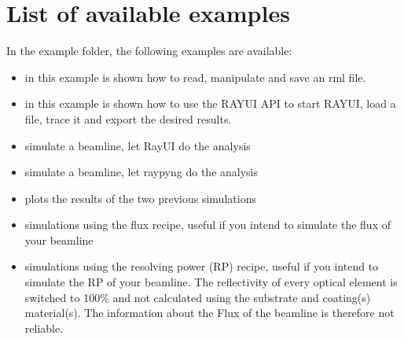 \documentclass[letterpaper,10pt,english]{sphinxmanual}
\begin{document}
\section{List of available examples}
\label{\detokenize{tutorial:list-of-available-examples}}
\sphinxAtStartPar
In the example folder, the following examples are available:
\begin{itemize}
\item {} 
\sphinxAtStartPar
{}
in this example is shown how to read, manipulate and save an rml file.

\item {} 
\sphinxAtStartPar
{}
in this example is shown how to use the RAY\sphinxhyphen{}UI API to start RAY\sphinxhyphen{}UI, load a file,
trace it and export the desired results.

\item {} 
\sphinxAtStartPar
{} simulate a beamline,
let Ray\sphinxhyphen{}UI do the analysis

\item {} 
\sphinxAtStartPar
{}
simulate a beamline,
let raypyng do the analysis

\item {} 
\sphinxAtStartPar
{}
plots the results
of the two previous simulations

\item {} 
\sphinxAtStartPar
{}
simulations using the flux recipe,
useful if you intend to simulate the flux of your beamline

\item {} 
\sphinxAtStartPar
{}
simulations using the resolving power
(RP) recipe, useful if you intend to simulate the RP of your beamline.
The reflectivity of every optical element is switched to 100\% and not
calculated using the substrate and coating(s) material(s). The
information about the Flux of the beamline is therefore not reliable.


\end{itemize}
\end{document}
